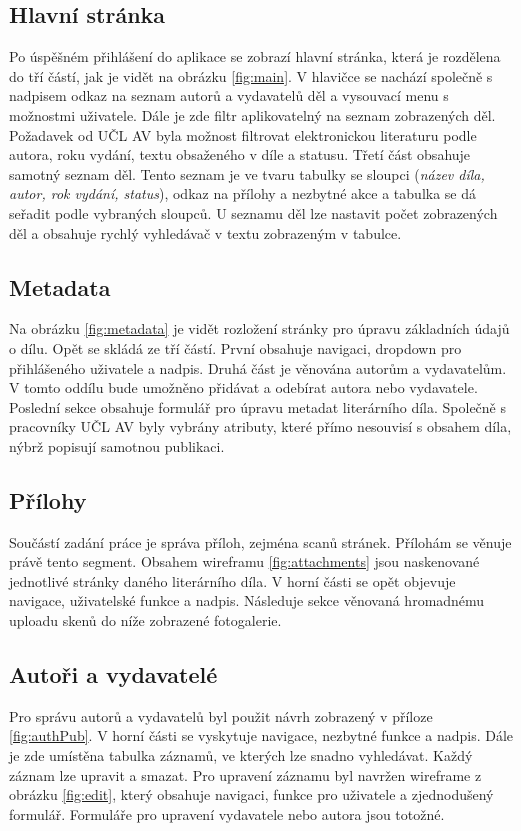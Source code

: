         \subsection{Hlavní stránka}
            Po úspěšném přihlášení do aplikace se zobrazí hlavní stránka, která je rozdělena do tří částí, jak je vidět na obrázku \ref{fig:main}. V hlavičce se nachází společně s nadpisem odkaz na seznam autorů a vydavatelů děl a vysouvací menu s možnostmi uživatele. Dále je zde filtr aplikovatelný na seznam zobrazených děl. Požadavek od UČL AV byla možnost filtrovat elektronickou literaturu podle autora, roku vydání, textu obsaženého v díle a statusu. Třetí část obsahuje samotný seznam děl. Tento seznam je ve tvaru tabulky se sloupci (\textit{název díla, autor, rok vydání, status}), odkaz na přílohy a nezbytné akce a tabulka se dá seřadit podle vybraných sloupců. U seznamu děl lze nastavit počet zobrazených děl a obsahuje rychlý vyhledávač v textu zobrazeným v tabulce.

        \subsection{Metadata}
            Na obrázku \ref{fig:metadata} je vidět rozložení stránky pro úpravu základních údajů o dílu. Opět se skládá ze tří částí. První obsahuje navigaci, dropdown pro přihlášeného uživatele a nadpis. Druhá část je věnována autorům a vydavatelům. V tomto oddílu bude umožněno přidávat a odebírat autora nebo vydavatele. Poslední sekce obsahuje formulář pro úpravu metadat literárního díla. Společně s pracovníky UČL AV byly vybrány atributy, které přímo nesouvisí s obsahem díla, nýbrž popisují samotnou publikaci. 
        
        \subsection{Přílohy}
            Součástí zadání práce je správa příloh, zejména scanů stránek. Přílohám se věnuje právě tento segment. Obsahem wireframu \ref{fig:attachments} jsou naskenované jednotlivé stránky daného literárního díla. V horní části se opět objevuje navigace, uživatelské funkce a nadpis. Následuje sekce věnovaná hromadnému uploadu skenů do níže zobrazené fotogalerie.
            
        \subsection{Autoři a vydavatelé}
            Pro správu autorů a vydavatelů byl použit návrh zobrazený v příloze \ref{fig:authPub}. V horní části se vyskytuje navigace, nezbytné funkce a nadpis. Dále je zde umístěna tabulka záznamů, ve kterých lze snadno vyhledávat. Každý záznam lze upravit a smazat. Pro upravení záznamu byl navržen wireframe z obrázku \ref{fig:edit}, který obsahuje navigaci, funkce pro uživatele a zjednodušený formulář. Formuláře pro upravení vydavatele nebo autora jsou totožné.
            

